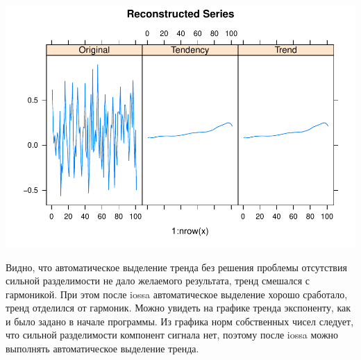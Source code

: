 \documentclass[
]{article}
\begin{document}
\includegraphics{iossa_trend-1.pdf}

Видно, что автоматическое выделение тренда без решения проблемы
отсутствия сильной разделимости не дало желаемого результата, тренд
смешался с гармоникой. При этом после iossa автоматическое выделение
хорошо сработало, тренд отделился от гармоник. Можно увидеть на графике
тренда экспоненту, как и было задано в начале программы. Из графика норм
собственных чисел следует, что сильной разделимости компонент сигнала
нет, поэтому после iossa можно выполнять автоматическое выделение
тренда.
\end{document}

